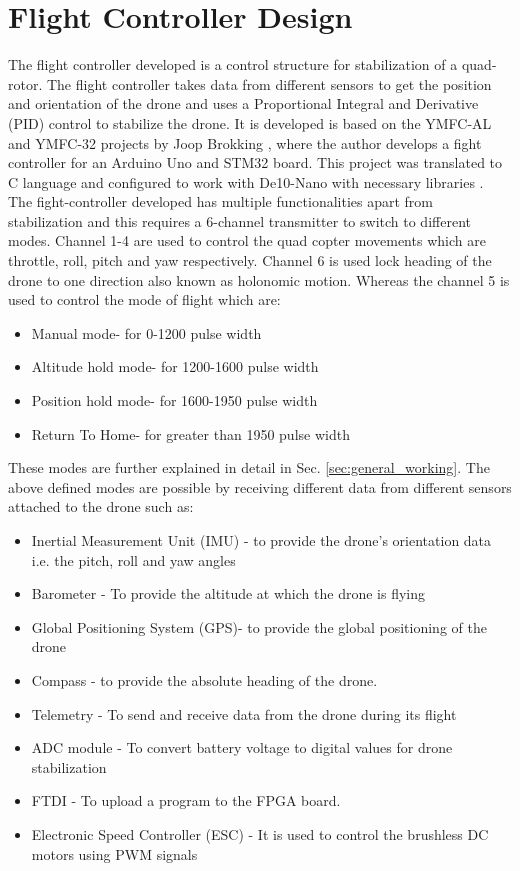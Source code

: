 \chapter{Flight Controller Design}\label{ch:sw}
The flight controller developed is a control structure for stabilization of a quad-rotor. The flight controller takes data from different sensors to get the position and orientation of the drone and uses a Proportional Integral and Derivative (PID) control to stabilize the drone. It is developed is based on the YMFC-AL and YMFC-32 projects by Joop Brokking \cite{bib:brooking}, where the author develops a fight controller for an Arduino Uno and STM32 board. This project was translated to C language and configured to work with De10-Nano with necessary libraries \cite{bib:gpsLib} \cite{bib:tu_viena}.
The fight-controller developed has multiple functionalities apart from stabilization and this requires a 6-channel transmitter to switch to different modes. Channel 1-4 are used to control the quad copter movements which are throttle, roll, pitch and yaw respectively. Channel 6 is used lock heading of the drone to one direction also known as holonomic motion. Whereas the channel 5 is used to control the mode of flight which are:
\begin{itemize}
    \item Manual mode- for 0-1200 pulse width 
    \item Altitude hold mode- for 1200-1600 pulse width 
    \item Position hold mode- for 1600-1950 pulse width 
    \item Return To Home- for greater than 1950 pulse width
\end{itemize}
These modes are further explained in detail in Sec. \ref{sec:general_working}.
The above defined modes are possible by receiving different data from different sensors attached to the drone such as:
\begin{itemize}
    \item Inertial Measurement Unit (IMU) - to provide the drone's orientation data i.e. the pitch, roll and yaw angles
    \item Barometer - To provide the altitude at which the drone is flying
    \item Global Positioning System (GPS)- to provide the global positioning of the drone
    \item Compass - to provide the absolute heading of the drone.
    \item Telemetry - To send and receive data from the drone during its flight
    \item ADC module - To convert battery voltage to digital values for drone stabilization
    \item FTDI -  To upload a program to the FPGA board.
    \item Electronic Speed Controller (ESC) - It is used to control the brushless DC motors using PWM signals
\end{itemize}

